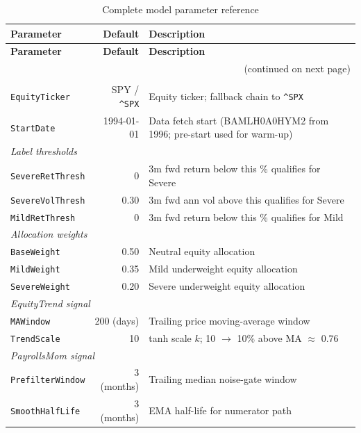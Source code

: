 \documentclass[11pt, a4paper]{article}
\begin{document}
\begin{longtable}{p{4.5cm} r p{7.5cm}}
\caption{Complete model parameter reference}\label{tab:params}\\
\toprule
\textbf{Parameter} & \textbf{Default} & \textbf{Description} \\
\midrule
\endfirsthead
\toprule
\textbf{Parameter} & \textbf{Default} & \textbf{Description} \\
\midrule
\endhead
\midrule
\multicolumn{3}{r}{\small(continued on next page)}\\
\endfoot
\bottomrule
\endlastfoot

\multicolumn{3}{l}{\textit{Data parameters}} \\
\texttt{EquityTicker}       & SPY / \texttt{\^{}SPX} & Equity ticker; fallback chain to \texttt{\^{}SPX} \\
\texttt{StartDate}          & 1994-01-01 & Data fetch start (BAMLH0A0HYM2 from 1996; pre-start used for warm-up) \\
\midrule
\multicolumn{3}{l}{\textit{Label thresholds}} \\
\texttt{SevereRetThresh}    & 0 & 3m fwd return below this \% qualifies for Severe \\
\texttt{SevereVolThresh}    & 0.30 & 3m fwd ann vol above this qualifies for Severe \\
\texttt{MildRetThresh}      & 0 & 3m fwd return below this \% qualifies for Mild \\
\midrule
\multicolumn{3}{l}{\textit{Allocation weights}} \\
\texttt{BaseWeight}         & 0.50 & Neutral equity allocation \\
\texttt{MildWeight}         & 0.35 & Mild underweight equity allocation \\
\texttt{SevereWeight}       & 0.20 & Severe underweight equity allocation \\
\midrule
\multicolumn{3}{l}{\textit{EquityTrend signal}} \\
\texttt{MAWindow}           & 200 (days) & Trailing price moving-average window \\
\texttt{TrendScale}         & 10 & tanh scale $k$; 10 $\to$ 10\% above MA $\approx$ 0.76 \\
\midrule
\multicolumn{3}{l}{\textit{PayrollsMom signal}} \\
\texttt{PrefilterWindow}    & 3 (months) & Trailing median noise-gate window \\
\texttt{SmoothHalfLife}     & 3 (months) & EMA half-life for numerator path \\

\end{longtable}
\end{document}
